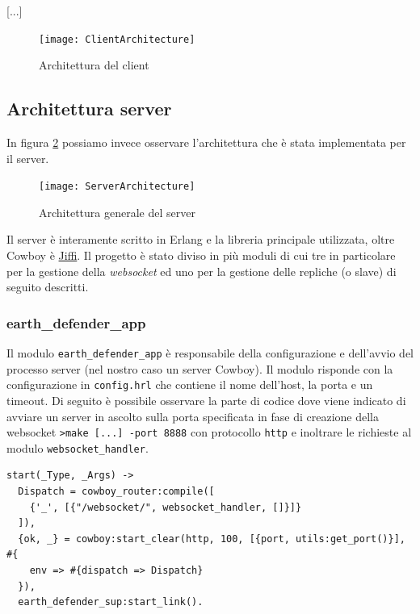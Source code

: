 \documentclass[paper=a4, fontsize=11pt]{scrartcl} %
\numberwithin{equation}{section} %
\numberwithin{figure}{section} %
\numberwithin{table}{section} %
\begin{document}
[...]

\begin{figure}
\centering
\texttt{[image: ClientArchitecture]}
\caption{Architettura del client}
\label{ClientArc}
\end{figure}

\subsection{Architettura server}
In figura \ref{ServerArc} possiamo invece osservare l'architettura che è stata implementata per il server.

\begin{figure}
\centering
\texttt{[image: ServerArchitecture]}
\caption{Architettura generale del server}
\label{ServerArc}
\end{figure}

Il server è interamente scritto in Erlang e la libreria principale utilizzata, oltre Cowboy è \href{https://github.com/davisp/jiffy}{Jiffi}. Il progetto è stato diviso in più moduli di cui tre in particolare per la gestione della \textit{websocket} ed uno per la gestione delle repliche (o slave) di seguito descritti.
\subsubsection{earth\_defender\_app}
Il modulo \texttt{earth\_defender\_app} è responsabile della configurazione e dell'avvio del processo server (nel nostro caso un server Cowboy). Il modulo risponde con la configurazione in \texttt{config.hrl} che contiene il nome dell'host, la porta e un timeout.
Di seguito è possibile osservare la parte di codice dove viene indicato di avviare un server in ascolto sulla porta specificata in fase di creazione della websocket \texttt{>make [...] -port 8888} con protocollo \texttt{http} e inoltrare le richieste al modulo \texttt{websocket\_handler}.
\begin{lstlisting}[basicstyle=\footnotesize]
start(_Type, _Args) ->
  Dispatch = cowboy_router:compile([
    {'_', [{"/websocket/", websocket_handler, []}]}
  ]),
  {ok, _} = cowboy:start_clear(http, 100, [{port, utils:get_port()}], #{
    env => #{dispatch => Dispatch}
  }),
  earth_defender_sup:start_link().
\end{lstlisting}
\end{document}
